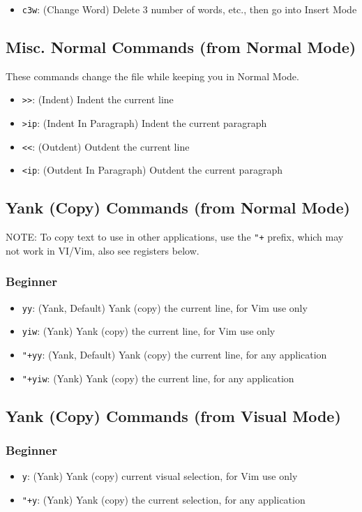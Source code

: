 \documentclass[11pt]{article}
\begin{document}
\begin{itemize}
\item \texttt{c3w}: (Change Word) Delete 3 number of words, etc., then go into Insert Mode
\end{itemize}
\subsection{Misc. Normal Commands (from Normal Mode)}
\label{sec:org1432392}
These commands change the file while keeping you in Normal Mode.
\begin{itemize}
\item \texttt{>>}: (Indent) Indent the current line
\item \texttt{>ip}: (Indent In Paragraph) Indent the current paragraph
\item \texttt{<<}: (Outdent) Outdent the current line
\item \texttt{<ip}: (Outdent In Paragraph) Outdent the current paragraph
\end{itemize}
\subsection{Yank (Copy) Commands (from Normal Mode)}
\label{sec:orgdfe0cb0}
NOTE: To copy text to use in other applications, use the \texttt{"+} prefix, which may
not work in VI/Vim, also see registers below.
\subsubsection{Beginner}
\label{sec:org770720c}
\begin{itemize}
\item \texttt{yy}: (Yank, Default) Yank (copy) the current line, for Vim use only
\item \texttt{yiw}: (Yank) Yank (copy) the current line, for Vim use only
\item \texttt{"+yy}: (Yank, Default) Yank (copy) the current line, for any application
\item \texttt{"+yiw}: (Yank) Yank (copy) the current line, for any application
\end{itemize}
\subsection{Yank (Copy) Commands (from Visual Mode)}
\label{sec:orge25efd1}
\subsubsection{Beginner}
\label{sec:orge326b86}
\begin{itemize}
\item \texttt{y}: (Yank) Yank (copy) current visual selection, for Vim use only
\item \texttt{"+y}: (Yank) Yank (copy) the current selection, for any application
\end{itemize}
\end{document}
